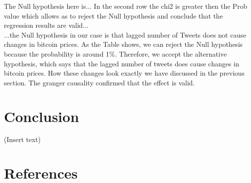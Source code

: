 \documentclass[a4paper,american,12pt]{article}
\begin{document}
\begin{spacing}{1.2}
The Null hypothesis here is... In the second row the chi2 is greater then the Prob value which allows as to reject the Null hypothesis and conclude that the regression results are valid...\\

...the Null hypothesis in our case is that lagged number of Tweets does not cause changes in bitcoin prices. As the Table shows, we can reject the Null hypothesis because the probability is around 1\%. Therefore, we accept the alternative hypothesis, which says that the lagged number of tweets does cause changes in bitcoin prices. How these changes look exactly we have discussed in the previous section. The granger causality confirmed that the effect is valid.

\clearpage

\section{Conclusion}
\label{sec:Conclustion}
(Insert text)

\clearpage
		
\end{spacing}

\clearpage

\section{References}
\printbibliography[heading=none]

\clearpage

\end{document}
